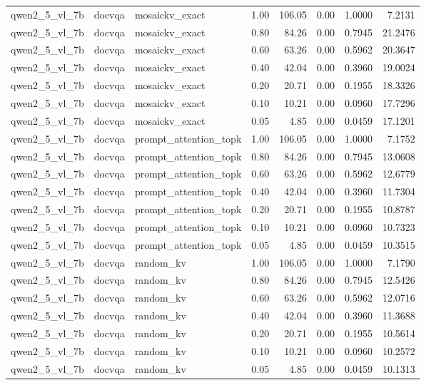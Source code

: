 \begin{longtable}{lllrrrrr}
qwen2\_5\_vl\_7b & docvqa & mosaickv\_exact & 1.00 & 106.05 & 0.00 & 1.0000 & 7.2131 \\
qwen2\_5\_vl\_7b & docvqa & mosaickv\_exact & 0.80 & 84.26 & 0.00 & 0.7945 & 21.2476 \\
qwen2\_5\_vl\_7b & docvqa & mosaickv\_exact & 0.60 & 63.26 & 0.00 & 0.5962 & 20.3647 \\
qwen2\_5\_vl\_7b & docvqa & mosaickv\_exact & 0.40 & 42.04 & 0.00 & 0.3960 & 19.0024 \\
qwen2\_5\_vl\_7b & docvqa & mosaickv\_exact & 0.20 & 20.71 & 0.00 & 0.1955 & 18.3326 \\
qwen2\_5\_vl\_7b & docvqa & mosaickv\_exact & 0.10 & 10.21 & 0.00 & 0.0960 & 17.7296 \\
qwen2\_5\_vl\_7b & docvqa & mosaickv\_exact & 0.05 & 4.85 & 0.00 & 0.0459 & 17.1201 \\
qwen2\_5\_vl\_7b & docvqa & prompt\_attention\_topk & 1.00 & 106.05 & 0.00 & 1.0000 & 7.1752 \\
qwen2\_5\_vl\_7b & docvqa & prompt\_attention\_topk & 0.80 & 84.26 & 0.00 & 0.7945 & 13.0608 \\
qwen2\_5\_vl\_7b & docvqa & prompt\_attention\_topk & 0.60 & 63.26 & 0.00 & 0.5962 & 12.6779 \\
qwen2\_5\_vl\_7b & docvqa & prompt\_attention\_topk & 0.40 & 42.04 & 0.00 & 0.3960 & 11.7304 \\
qwen2\_5\_vl\_7b & docvqa & prompt\_attention\_topk & 0.20 & 20.71 & 0.00 & 0.1955 & 10.8787 \\
qwen2\_5\_vl\_7b & docvqa & prompt\_attention\_topk & 0.10 & 10.21 & 0.00 & 0.0960 & 10.7323 \\
qwen2\_5\_vl\_7b & docvqa & prompt\_attention\_topk & 0.05 & 4.85 & 0.00 & 0.0459 & 10.3515 \\
qwen2\_5\_vl\_7b & docvqa & random\_kv & 1.00 & 106.05 & 0.00 & 1.0000 & 7.1790 \\
qwen2\_5\_vl\_7b & docvqa & random\_kv & 0.80 & 84.26 & 0.00 & 0.7945 & 12.5426 \\
qwen2\_5\_vl\_7b & docvqa & random\_kv & 0.60 & 63.26 & 0.00 & 0.5962 & 12.0716 \\
qwen2\_5\_vl\_7b & docvqa & random\_kv & 0.40 & 42.04 & 0.00 & 0.3960 & 11.3688 \\
qwen2\_5\_vl\_7b & docvqa & random\_kv & 0.20 & 20.71 & 0.00 & 0.1955 & 10.5614 \\
qwen2\_5\_vl\_7b & docvqa & random\_kv & 0.10 & 10.21 & 0.00 & 0.0960 & 10.2572 \\
qwen2\_5\_vl\_7b & docvqa & random\_kv & 0.05 & 4.85 & 0.00 & 0.0459 & 10.1313 \\

\end{longtable}
